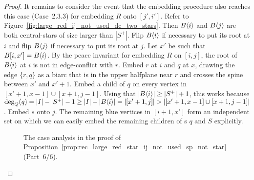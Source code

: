 \documentclass[11pt,a4paper,colorlinks=true,urlcolor=blue,citecolor=red]{article}
\theoremstyle{plain}
\begin{document}
\begin{proof}
  It remains to consider the event that the embedding procedure also
  reaches this case (Case~2.3.3) for embedding $R$ onto $[j',i']$. Refer
  to Figure~\ref{fig:large_red_ij_not_used_dc_two_stars}. Then
  $B\langle{i}\rangle$ and $B\langle{j}\rangle$ are both central-stars of size larger
  than $|S^+|$. Flip $B\langle{i}\rangle$ if necessary to put its root at $i$
  and flip $B\langle{j}\rangle$ if necessary to put its root at $j$. Let $x'$ be
  such that $B[i,x']=B\langle{i}\rangle$. By the peace invariant for embedding
  $R$ on $[i,j]$, the root of $B\langle{i}\rangle$ at $i$ is not in
  edge-conflict with $r$. Embed $r$ at $i$ and $q$ at $x$, drawing the
  edge $\{r,q\}$ as a biarc that is in the upper halfplane near $r$ and
  crosses the spine between $x'$ and $x'+1$. Embed a child of $q$ on
  every vertex in $[x'+1,x-1]\cup[x+1,j-1]$. Using that
  $|B\langle{i}\rangle|\geq|S^+|+1$, this works because
  $\deg_Q(q)=|I|-|S^+|-1\geq|I|-|\treeat{i}|=|[x'+1,j]|>|[x'+1,x-1]\cup[x+1,j-1]|$.
  Embed $s$ onto $j$. The remaining blue vertices in $[i+1,x']$ form an
  independent set on which we can easily embed the remaining children of
  s $q$ and $S$ explicitly.

  \begin{figure}
    \centering {}\caption{The case analysis in the proof of
      Proposition~\ref{prop:rec_large_red_star_ij_not_used_sp_not_star}~(Part~6/6).}
  \end{figure}
\end{proof}
\end{document}
